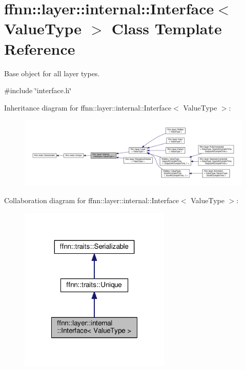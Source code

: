 \hypertarget{classffnn_1_1layer_1_1internal_1_1_interface}{\section{ffnn\-:\-:layer\-:\-:internal\-:\-:Interface$<$ Value\-Type $>$ Class Template Reference}
\label{classffnn_1_1layer_1_1internal_1_1_interface}
}


Base object for all layer types.  




{\ttfamily \#include \char`\"{}interface.\-h\char`\"{}}



Inheritance diagram for ffnn\-:\-:layer\-:\-:internal\-:\-:Interface$<$ Value\-Type $>$\-:\nopagebreak
\begin{figure}[H]
\begin{center}
\leavevmode
\includegraphics[width=350pt]{classffnn_1_1layer_1_1internal_1_1_interface__inherit__graph}
\end{center}
\end{figure}


Collaboration diagram for ffnn\-:\-:layer\-:\-:internal\-:\-:Interface$<$ Value\-Type $>$\-:\nopagebreak
\begin{figure}[H]
\begin{center}
\leavevmode
\includegraphics[width=204pt]{classffnn_1_1layer_1_1internal_1_1_interface__coll__graph}
\end{center}
\end{figure}
